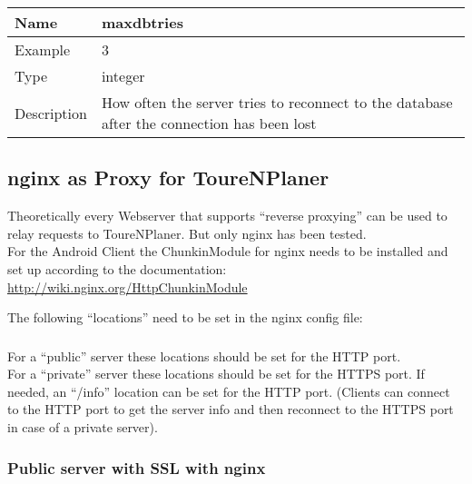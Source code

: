 \documentclass[ngerman,titlepage,parskip=true]{scrartcl}
\newcommand{\configoption}[4]
{%
\setlength{\extrarowheight}{2pt}
\begin{tabular}{|p{0.2\textwidth}|p{0.9\textwidth}|}
\hline
  \textbf{Name} & \textbf{#1}\\\hline
  Example & #2\\\hline
  Type & #3\\\hline
  Description & #4\\\hline
\end{tabular}
}
\begin{document}
\configoption
{maxdbtries}
{3}
{integer}
{How often the server tries to reconnect to the database after the connection has been lost}

\subsection{nginx as Proxy for ToureNPlaner}

Theoretically every Webserver that supports ``reverse proxying'' can be used to relay requests to ToureNPlaner. But only nginx has been tested.\\

For the Android Client the ChunkinModule for nginx needs to be installed and set up according to the documentation:
\url{http://wiki.nginx.org/HttpChunkinModule}

The following ``locations'' need to be set in the nginx config file:



\subsubsection{}
For a ``public'' server these locations should be set for the HTTP port.\\
For a ``private'' server these locations should be set for the HTTPS port. If needed, an ``/info'' location can be set for the HTTP port. (Clients can connect to the HTTP port to get the server info and then reconnect to the HTTPS port in case of a private server).

\subsubsection{Public server with SSL with nginx}
\end{document}
